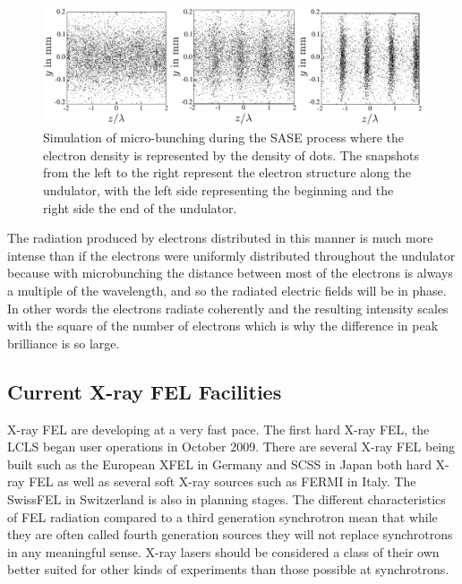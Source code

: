 \begin{figure}[h]
\centering
  \includegraphics[width=1.0 \columnwidth]{micro-bunching.png}
  \caption{Simulation of micro-bunching during the SASE process where the
    electron density is represented by the density of dots. The snapshots
    from the left to the right represent the electron structure along the
    undulator, with the left side representing the beginning and the right side
    the end of the undulator. \cite{Materlik2001TESLA}}
  \label{Fig:Brilliance}
\end{figure}

The radiation produced by electrons distributed in this manner is much more
intense than if the electrons were uniformly distributed throughout the
undulator because with microbunching the distance between most of the electrons is
always a multiple of the wavelength, and so the radiated electric fields will be
in phase. In other words the electrons radiate coherently and the resulting
intensity scales with the square of the number of electrons which is why the
difference in peak brilliance is so large.

\subsection{Current X-ray FEL Facilities}

X-ray FEL are developing at a very fast pace. The first hard X-ray FEL, the LCLS
began user operations in October 2009.
There are several X-ray FEL
being built such as the European XFEL in Germany and SCSS
in Japan both hard X-ray FEL as well as several soft X-ray sources such as FERMI
in Italy. The SwissFEL in Switzerland is also in planning stages. 
The different characteristics of FEL radiation compared to a third generation synchrotron mean that while they are
often called fourth generation sources they will not replace synchrotrons in any
meaningful sense.
X-ray lasers should be considered a class of
their own better suited for other kinds of experiments than those possible at synchrotrons.


